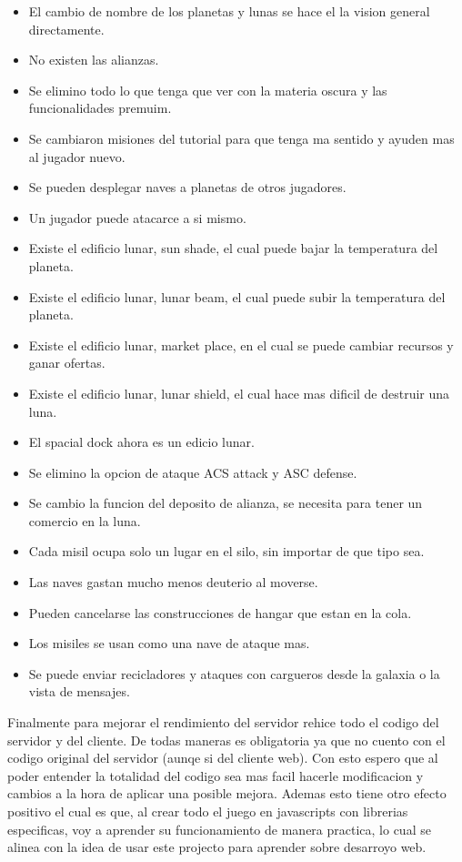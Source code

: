 \documentclass{article}
\begin{document}
\begin{itemize}[noitemsep]
    \item El cambio de nombre de los planetas y lunas se hace el la vision general directamente.
    \item No existen las alianzas.
    \item Se elimino todo lo que tenga que ver con la materia oscura y las funcionalidades premuim.
    \item Se cambiaron misiones del tutorial para que tenga ma sentido y ayuden mas al jugador nuevo.
    \item Se pueden desplegar naves a planetas de otros jugadores.
    \item Un jugador puede atacarce a si mismo.
    \item Existe el edificio lunar, sun shade, el cual puede bajar la temperatura del planeta.
    \item Existe el edificio lunar, lunar beam, el cual puede subir la temperatura del planeta.
    \item Existe el edificio lunar, market place, en el cual se puede cambiar recursos y ganar ofertas.
    \item Existe el edificio lunar, lunar shield, el cual hace mas dificil de destruir una luna.
    \item El spacial dock ahora es un edicio lunar.
    \item Se elimino la opcion de ataque ACS attack y ASC defense.
    \item Se cambio la funcion del deposito de alianza, se necesita para tener un comercio en la luna.
    \item Cada misil ocupa solo un lugar en el silo, sin importar de que tipo sea.
    \item Las naves gastan mucho menos deuterio al moverse.
    \item Pueden cancelarse las construcciones de hangar que estan en la cola.
    \item Los misiles se usan como una nave de ataque mas.
    \item Se puede enviar recicladores y ataques con cargueros desde la galaxia o la vista de mensajes.
\end{itemize}
        
Finalmente para mejorar el rendimiento del servidor rehice todo el codigo del servidor y del cliente. De todas maneras es obligatoria ya que no cuento con el codigo original del servidor (aunqe si del cliente web). Con esto espero que al poder entender la totalidad del codigo sea mas facil hacerle modificacion y cambios a la hora de aplicar una posible mejora. Ademas esto tiene otro efecto positivo el cual es que, al crear todo el juego en javascripts con librerias especificas, voy a aprender su funcionamiento de manera practica, lo cual se alinea con la idea de usar este projecto para aprender sobre desarroyo web.
\end{document}
